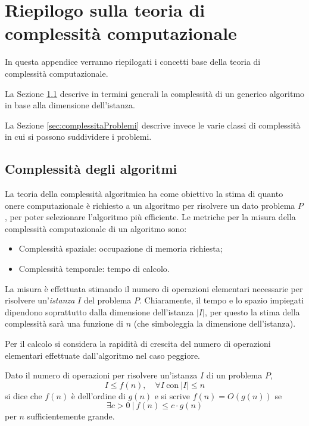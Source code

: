 \appendix
{}
\chapter[Riepilogo complessità computazionale]{Riepilogo sulla teoria di complessità 
computazionale}
\label{chap:appA}
In questa appendice verranno riepilogati i concetti base della teoria di complessità 
computazionale.

La Sezione \ref{sec:complessitaAlgoritmi} descrive in termini generali la 
complessità di un generico algoritmo in base alla dimensione dell'istanza.

La Sezione \ref{sec:complessitaProblemi} descrive invece le varie classi di complessità 
in cui si possono suddividere i problemi.


\section{Complessità degli algoritmi}
\label{sec:complessitaAlgoritmi}
La teoria della complessità algoritmica ha come obiettivo la stima di quanto onere 
computazionale è richiesto a un algoritmo per risolvere un dato problema $P$, per poter 
selezionare l'algoritmo più efficiente. Le metriche per la misura della complessità 
computazionale di un algoritmo sono:
\begin{itemize}
 \item Complessità spaziale: occupazione di memoria richiesta;
 \item Complessità temporale: tempo di calcolo.
\end{itemize}
La misura è effettuata stimando il numero di operazioni elementari necessarie per 
risolvere un'\emph{istanza} $I$ del problema $P$. Chiaramente, il tempo e lo spazio 
impiegati dipendono soprattutto dalla dimensione dell'istanza $\vert I \vert$, per questo 
la stima della complessità sarà una funzione di $n$ (che simboleggia la dimensione 
dell'istanza).

Per il calcolo si considera la rapidità di crescita del numero di operazioni elementari 
effettuate dall'algoritmo nel caso peggiore.
\begin{mydef}
\label{def:definizioneComplessita}
Dato il numero di operazioni per 
risolvere un'istanza $I$ di un problema $P$,
\begin{displaymath}
 I \leq f(n), \quad \forall I\  \text{con}\  \vert I \vert \leq n
\end{displaymath}
si dice che $f(n)$ è dell'ordine di $g(n)$ e si scrive $f(n) = O(g(n))$ se
\begin{equation}
 \exists c > 0\  \vert\  f(n) \leq c\cdot g(n)
\end{equation}
per $n$ sufficientemente grande.
\end{mydef}

